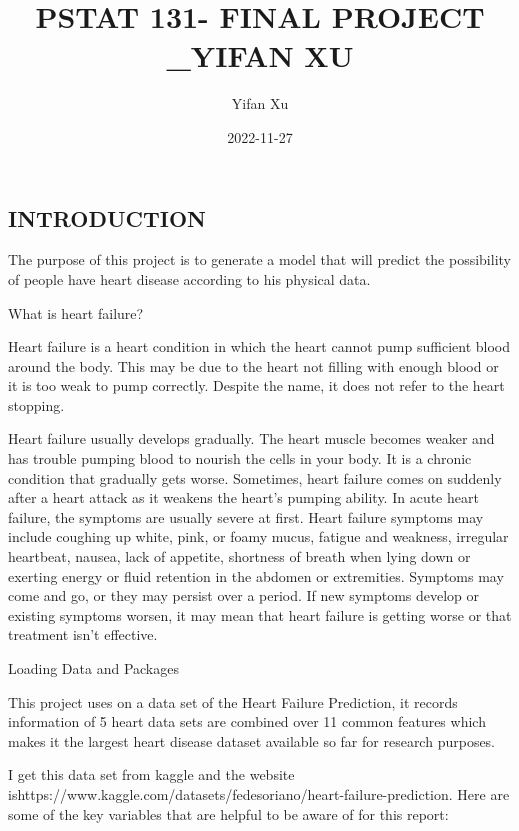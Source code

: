 \documentclass[
]{article}
\title{PSTAT 131- FINAL PROJECT \_YIFAN XU}
\author{Yifan Xu}
\date{2022-11-27}
\begin{document}
\maketitle

{
\setcounter{tocdepth}{2}
\tableofcontents
}
\hypertarget{introduction}{%
\subsection{INTRODUCTION}\label{introduction}}

The purpose of this project is to generate a model that will predict the
possibility of people have heart disease according to his physical data.

What is heart failure?

Heart failure is a heart condition in which the heart cannot pump
sufficient blood around the body. This may be due to the heart not
filling with enough blood or it is too weak to pump correctly. Despite
the name, it does not refer to the heart stopping.

Heart failure usually develops gradually. The heart muscle becomes
weaker and has trouble pumping blood to nourish the cells in your body.
It is a chronic condition that gradually gets worse. Sometimes, heart
failure comes on suddenly after a heart attack as it weakens the heart's
pumping ability. In acute heart failure, the symptoms are usually severe
at first. Heart failure symptoms may include coughing up white, pink, or
foamy mucus, fatigue and weakness, irregular heartbeat, nausea, lack of
appetite, shortness of breath when lying down or exerting energy or
fluid retention in the abdomen or extremities. Symptoms may come and go,
or they may persist over a period. If new symptoms develop or existing
symptoms worsen, it may mean that heart failure is getting worse or that
treatment isn't effective.

Loading Data and Packages

This project uses on a data set of the Heart Failure Prediction, it
records information of 5 heart data sets are combined over 11 common
features which makes it the largest heart disease dataset available so
far for research purposes.

I get this data set from kaggle and the website
ishttps://www.kaggle.com/datasets/fedesoriano/heart-failure-prediction.
Here are some of the key variables that are helpful to be aware of for
this report:
\end{document}
